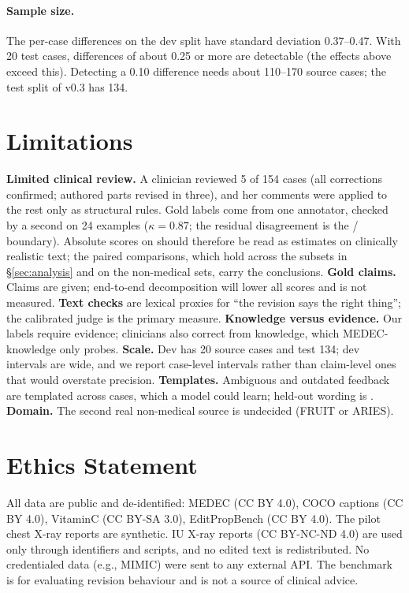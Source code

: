 \paragraph{Sample size.} The per-case differences on the dev split have standard deviation 0.37--0.47. With 20 test cases, differences of about 0.25 or more are detectable (the effects above exceed this). Detecting a 0.10 difference needs about 110--170 source cases; the test split of \ms{} v0.3 has 134.

\section{Limitations}
\label{sec:limits}
\textbf{Limited clinical review.} A clinician reviewed 5 of 154 cases (all corrections confirmed; authored parts revised in three), and her comments were applied to the rest only as structural rules. Gold labels come from one annotator, checked by a second on 24 examples ($\kappa=0.87$; the residual disagreement is the \D{}/\Pp{} boundary). Absolute scores on \ms{} should therefore be read as estimates on clinically realistic text; the paired comparisons, which hold across the subsets in \S\ref{sec:analysis} and on the non-medical sets, carry the conclusions. \textbf{Gold claims.} Claims are given; end-to-end decomposition will lower all scores and is not measured. \textbf{Text checks} are lexical proxies for ``the revision says the right thing''; the calibrated judge is the primary measure. \textbf{Knowledge versus evidence.} Our labels require evidence; clinicians also correct from knowledge, which MEDEC-knowledge only probes. \textbf{Scale.} Dev has 20 source cases and test 134; dev intervals are wide, and we report case-level intervals rather than claim-level ones that would overstate precision. \textbf{Templates.} Ambiguous and outdated feedback are templated across cases, which a model could learn; held-out wording is . \textbf{Domain.} The second real non-medical source is undecided (FRUIT or ARIES).

\section*{Ethics Statement}
All data are public and de-identified: MEDEC (CC BY 4.0), COCO captions (CC BY 4.0), VitaminC (CC BY-SA 3.0), EditPropBench (CC BY 4.0). The pilot chest X-ray reports are synthetic. IU X-ray reports (CC BY-NC-ND 4.0) are used only through identifiers and scripts, and no edited text is redistributed. No credentialed data (e.g., MIMIC) were sent to any external API. The benchmark is for evaluating revision behaviour and is not a source of clinical advice.

